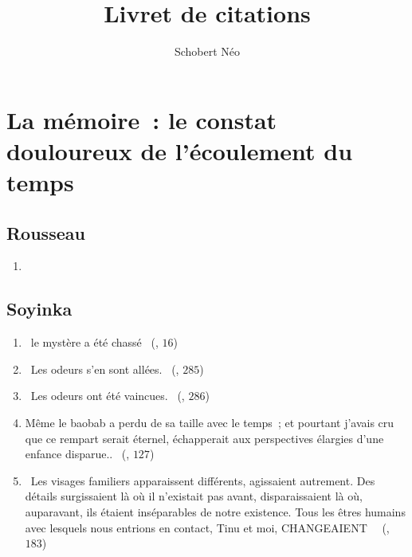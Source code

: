 \documentclass[a4paper, 11pt, hidelinks]{article}
\newcommand{\rb}[1]{\Romanbar{#1}}
\begin{document}
\newcommand{\grad}[1]{\vv{grad}#1}


\title{Livret de citations}
\author{Schobert Néo}

\maketitle

\tableofcontents


\newpage

















\section{La mémoire : le constat douloureux de l’écoulement du temps}


\subsection{Rousseau}

\begin{enumerate}
    \item 
\end{enumerate}


\subsection{Soyinka}


\begin{enumerate}
    \item \og{} le mystère a été chassé \fg{} (\rb{1}, $16$)
    \item \og{} Les odeurs s’en sont allées. \fg{} (\rb{10}, $285$) 
    \item \og{} Les odeurs ont été vaincues. \fg{} (\rb{10}, $286$)
    \item \og{} Même le baobab a perdu de sa taille avec le temps ; et pourtant j’avais cru que ce rempart serait éternel, échapperait aux perspectives élargies d’une enfance disparue.. \fg{} (\rb{5}, $127$)
    \item \og{} Les visages familiers apparaissent différents, agissaient autrement. Des détails surgissaient là où il n’existait pas avant, disparaissaient là où, auparavant, ils étaient inséparables de notre existence. Tous les êtres humains avec lesquels nous entrions en contact, Tinu et moi, CHANGEAIENT  \fg{} (\rb{7}, $183$)
\end{enumerate}
\end{document}
